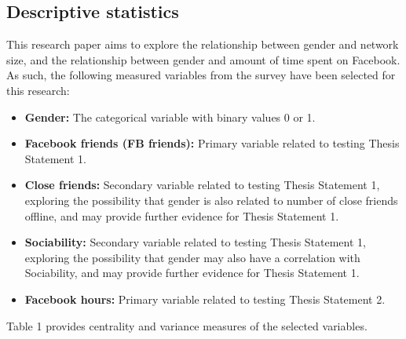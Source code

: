 
\subsection{Descriptive statistics}

This research paper aims to explore the relationship between gender and network size, and the relationship between gender and amount of time spent on Facebook. As such, the following measured variables from the survey have been selected for this research:\\

\begin{itemize}
\item \textbf{Gender:} The categorical variable with binary values 0 or 1.
\item \textbf{Facebook friends (FB friends):} Primary variable related to testing Thesis Statement 1.
\item \textbf{Close friends:} Secondary variable related to testing Thesis Statement 1, exploring the possibility that gender is also related to number of close friends offline, and may provide further evidence for Thesis Statement 1.
\item \textbf{Sociability:} Secondary variable related to testing Thesis Statement 1, exploring the possibility that gender may also have a correlation with Sociability, and may provide further evidence for Thesis Statement 1.
\item \textbf{Facebook hours:} Primary variable related to testing Thesis Statement 2.
\end{itemize}

Table 1 provides centrality and variance measures of the selected variables.\\

